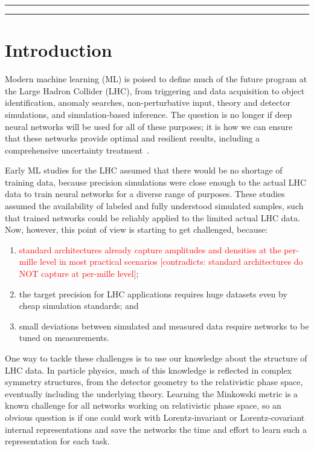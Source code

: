\documentclass[submission, Phys]{SciPost}
\begin{document}

\vspace{10pt}
\noindent\rule{\textwidth}{1pt}
\tableofcontents\thispagestyle{fancy}
\noindent\rule{\textwidth}{1pt}
\vspace{10pt}

\newpage
\section{Introduction}
\label{sec:intro}

Modern machine learning (ML) is poised to define much of the future program at the Large Hadron Collider (LHC), from triggering and data acquisition to object identification, anomaly searches, non-perturbative input, theory and detector simulations, and simulation-based inference. The question is no longer if deep neural networks will be used for all of these purposes; it is how we can ensure that these networks provide optimal and resilient results, including a comprehensive uncertainty treatment~\cite{Plehn:2022ftl}. 

Early ML studies for the LHC assumed that there would be no shortage of training data, because precision simulations were close enough to the actual LHC data to train neural networks for a diverse range of purposes.
%
These studies assumed the availability of labeled and fully understood simulated samples, such that trained networks could be reliably applied to the limited actual LHC data.
%
Now, however, this point of view is starting to get challenged, because:
%
\begin{enumerate}
\item \textcolor{red}{standard architectures already capture amplitudes and densities at the per-mille level in most practical scenarios [contradicts: standard architectures do NOT capture at per-mille level]}; 
\item the target precision for LHC applications requires huge datasets even by cheap simulation standards; and
\item small deviations between simulated and measured data require networks to be tuned on measurements.
\end{enumerate}
%
One way to tackle these challenges is to use our knowledge about the structure of LHC data. In particle physics, much of this knowledge is reflected in complex symmetry structures, from the detector geometry to the relativistic phase space, eventually including the underlying theory. Learning the Minkowski metric is a known challenge for all networks working on relativistic phase space, so an obvious question is if one could work with Lorentz-invariant or Lorentz-covariant internal representations and save the networks the time and effort to learn such a representation for each task.
\end{document}
